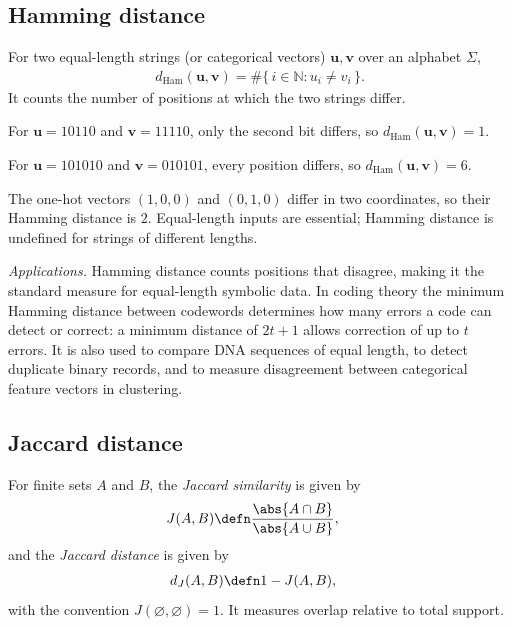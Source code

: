 \documentclass[a4paper, 12pt]{book}
\begin{document}
\subsection{Hamming distance}
\begin{definition}
    For two equal-length strings (or categorical vectors) $\mathbf{u},\mathbf{v}$ over an alphabet $\Sigma$,
    \begin{align}
        d_{\mathrm{Ham}}(\mathbf{u},\mathbf{v}) = \#\Big\{\,i \in \mathbb{N}:u_i\neq v_i\,\Big\}.
    \end{align}
    It counts the number of positions at which the two strings differ.
\end{definition}

\begin{example}
    For $\mathbf{u}=10110$ and $\mathbf{v}=11110$, only the second bit differs, so $d_{\mathrm{Ham}}(\mathbf{u},\mathbf{v})=1$.
\end{example}

\begin{example}
    For $\mathbf{u}=101010$ and $\mathbf{v}=010101$, every position differs, so $d_{\mathrm{Ham}}(\mathbf{u},\mathbf{v})=6$.
\end{example}

\begin{example}
    The one-hot vectors $(1,0,0)$ and $(0,1,0)$ differ in two coordinates, so their Hamming distance is $2$. Equal-length inputs are essential; Hamming distance is undefined for strings of different lengths.
\end{example}

\emph{Applications.} Hamming distance counts positions that disagree, making it the standard measure for equal-length symbolic data. In coding theory the minimum Hamming distance between codewords determines how many errors a code can detect or correct: a minimum distance of $2t+1$ allows correction of up to $t$ errors. It is also used to compare DNA sequences of equal length, to detect duplicate binary records, and to measure disagreement between categorical feature vectors in clustering.

\subsection{Jaccard distance}
\begin{definition}
    For finite sets $A$ and $B$, the \emph{Jaccard similarity} is given by
    \begin{align}
        J(A,B) &\defn \frac{\abs{A\cap B}}{\abs{A\cup B}},
    \end{align}
    and the \emph{Jaccard distance} is given by
    \begin{align}
        d_J(A,B) &\defn 1-J(A,B),
    \end{align}
    with the convention $J(\varnothing,\varnothing)=1$. It measures overlap relative to total support.
\end{definition}
\end{document}

